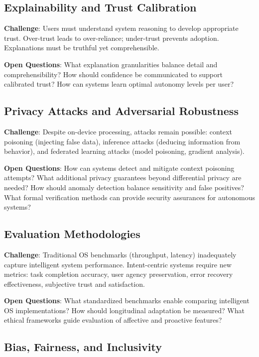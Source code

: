 \documentclass[conference]{IEEEtran}
\begin{document}
\subsection{Explainability and Trust Calibration}

\textbf{Challenge}: Users must understand system reasoning to develop appropriate trust. Over-trust leads to over-reliance; under-trust prevents adoption. Explanations must be truthful yet comprehensible.

\textbf{Open Questions}: What explanation granularities balance detail and comprehensibility? How should confidence be communicated to support calibrated trust? How can systems learn optimal autonomy levels per user?

\subsection{Privacy Attacks and Adversarial Robustness}

\textbf{Challenge}: Despite on-device processing, attacks remain possible: context poisoning (injecting false data), inference attacks (deducing information from behavior), and federated learning attacks (model poisoning, gradient analysis).

\textbf{Open Questions}: How can systems detect and mitigate context poisoning attempts? What additional privacy guarantees beyond differential privacy are needed? How should anomaly detection balance sensitivity and false positives? What formal verification methods can provide security assurances for autonomous systems?

\subsection{Evaluation Methodologies}

\textbf{Challenge}: Traditional OS benchmarks (throughput, latency) inadequately capture intelligent system performance. Intent-centric systems require new metrics: task completion accuracy, user agency preservation, error recovery effectiveness, subjective trust and satisfaction.

\textbf{Open Questions}: What standardized benchmarks enable comparing intelligent OS implementations? How should longitudinal adaptation be measured? What ethical frameworks guide evaluation of affective and proactive features?

\subsection{Bias, Fairness, and Inclusivity}
\end{document}
